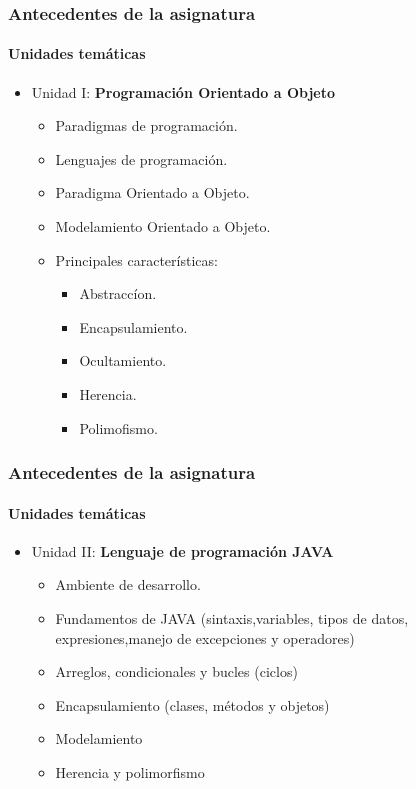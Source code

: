 \documentclass{beamer}
\begin{document}
		\begin{frame}
			\frametitle{Antecedentes de la asignatura}
			\framesubtitle{Unidades tem\'aticas}

			\begin{itemize}
				\item Unidad I: \textbf{Programaci\'on Orientado a Objeto}
				\begin{itemize}
					\item Paradigmas de programaci\'on.
					\item Lenguajes de programaci\'on.
					\item Paradigma Orientado a Objeto.
					\item Modelamiento Orientado a Objeto.
					\item Principales caracter\'isticas:
\begin{itemize}
						\item {Abstracc\'ion}.
						\item {Encapsulamiento}.
						\item {Ocultamiento}.
						\item{ Herencia}.
						\item {Polimofismo}.
\end{itemize}
				\end{itemize}
			\end{itemize}
		\end{frame}

		\begin{frame}
			\frametitle{Antecedentes de la asignatura}
			\framesubtitle{Unidades tem\'aticas}

			\begin{itemize}
				\item Unidad II: \textbf{Lenguaje de programaci\'on JAVA}
				\begin{itemize}
					\item Ambiente  de desarrollo.
					\item Fundamentos de JAVA (sintaxis,variables, tipos de datos, expresiones,manejo de excepciones y operadores)
					\item Arreglos, condicionales y bucles (ciclos)
					\item Encapsulamiento (clases, m\'etodos y objetos)
					\item Modelamiento
					\item Herencia y polimorfismo
				\end{itemize}
			\end{itemize}
		\end{frame}
\end{document}
